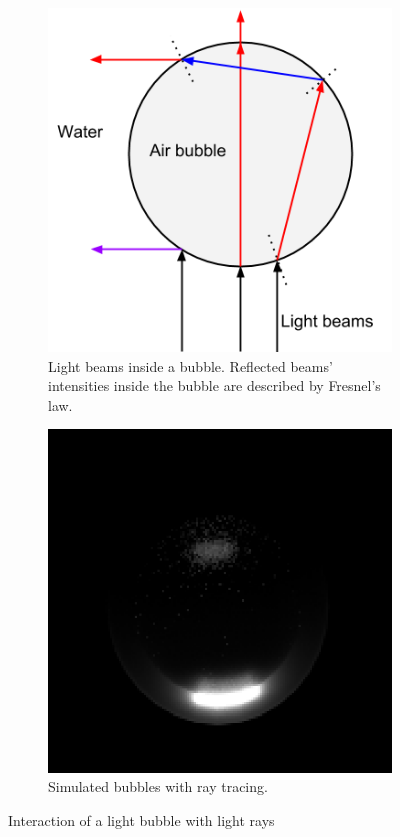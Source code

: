 			\begin{figure}
		    \centering
		    \begin{subfigure}[b]{0.5\textwidth}
		    		\centering
		        \includegraphics[scale=.5]{images/bubble_refraction.png}
		        \caption{Light beams inside a bubble. Reflected beams' intensities inside the bubble are described by Fresnel's law.}
		        \label{subfig:bubble_refraction}
		    \end{subfigure}
		    
		    \begin{subfigure}[b]{0.5\textwidth}
		    		\centering
		        \includegraphics[scale=0.6]{images/bubble_simulation.png}
		        \caption{Simulated bubbles with ray tracing.}	
		        \label{subfig:bubble_simulation}
		    \end{subfigure}
		    
		    \caption{Interaction of a light bubble with light rays}
		    \label{fig:bubble_physics}
	 		\end{figure}	
			

